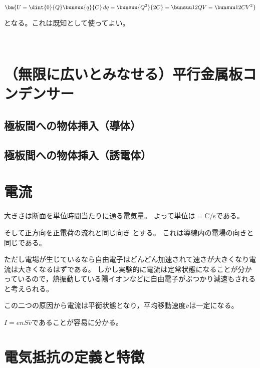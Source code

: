   $$\bm{U=\dint{0}{Q}\bunsuu{q}{C}\,dq=\bunsuu{Q^2}{2C}=\bunsuu12QV=\bunsuu12CV^2}$$

  となる。これは既知として使ってよい。

  ﻿\section{（無限に広いとみなせる）平行金属板コンデンサー}




  \subsection{極板間への物体挿入（導体）}




  \subsection{極板間への物体挿入（誘電体）}




 \section{電流}
 大きさは断面を単位時間当たりに通る電気量。
 よって単位は\unit{}${}={}$\unit{C/s}である。

 そして正方向を正電荷の流れと同じ向き
 とする。
 これは導線内の電場の向きと同じである。

 ただし電場が生じているなら自由電子はどんどん加速されて速さが大きくなり電流は大きくなるはずである。
 しかし実験的に電流は定常状態になることが分かっているので，熱振動している陽イオンなどに自由電子がぶつかり減速もされる
 と考えられる。

 この二つの原因から電流は平衡状態となり，平均移動速度$\overline{v}$は一定になる。


 $I=enS\overline{v}$であることが容易に分かる。

 \section{電気抵抗の定義と特徴}

